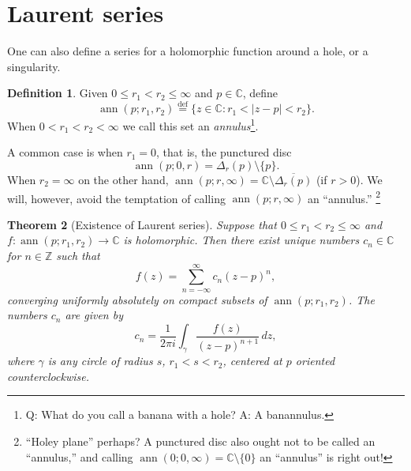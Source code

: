 \documentclass[12pt,openany]{book}
\newcommand{\ann}{\operatorname{ann}}
\newcommand{\sabs}[1]{\lvert {#1} \rvert}
\newcommand{\C}{{\mathbb{C}}}
\newcommand{\Z}{{\mathbb{Z}}}
\newcommand{\myindex}[1]{#1\index{#1}}
\newcommand{\myquote}[1]{``#1''}
\theoremstyle{plain}
\newtheorem{thm}{Theorem}[section]
\theoremstyle{remark}
\theoremstyle{definition}
\newtheorem{defn}[thm]{Definition}
\theoremstyle{exercise}
\theoremstyle{example}
\begin{document}

\section{Laurent series}

One can also define a series for a holomorphic function around a hole, or a singularity.

\begin{defn}
Given $0 \leq r_1 < r_2 \leq \infty$ and $p \in \C$, define
%
\begin{equation*}
\ann(p;r_1,r_2)
\overset{\text{def}}{=}
\{ z \in \C : r_1 < \sabs{z - p} < r_2 \} .
\end{equation*}
When $0 < r_1 < r_2 < \infty$ we call this set an
\emph{\myindex{annulus}}\footnote{%
Q\@: What do you call a banana with a hole?
A\@: A banannulus.}.
\end{defn}

A common case is when $r_1 = 0$, that is,
the punctured disc
\begin{equation*}
\ann(p;0,r) = \Delta_r(p) \setminus \{ p \} .
\end{equation*}
When $r_2 = \infty$ on the other hand,
$\ann(p;r,\infty) = \C \setminus \overline{\Delta_{r}(p)}$ (if $r > 0$).  We will,
however, avoid the temptation of calling $\ann(p;r,\infty)$ an \myquote{annulus.}%
\footnote{\myquote{Holey plane} perhaps?  A punctured disc also ought not to be
called an \myquote{annulus,} and calling $\ann(0;0,\infty) = \C \setminus
\{ 0 \}$ an \myquote{annulus} is right out!}

\begin{thm}[Existence of Laurent series]
%
%
\label{thm:laurent}%
Suppose that $0 \leq r_1 < r_2 \leq \infty$ and
$f \colon \ann(p;r_1,r_2) \to \C$ is holomorphic.
Then there exist unique numbers $c_n \in \C$ for $n \in \Z$ such that
%
\begin{equation*}
f(z) = \sum_{n=-\infty}^{\infty} c_n {(z-p)}^n ,
\end{equation*}
converging uniformly absolutely on compact subsets of
$\ann(p;r_1,r_2)$.  The numbers $c_n$ are given by
\begin{equation*}
c_n = 
\frac{1}{2\pi i}
\int_{\gamma}
\frac{f(z)}{{(z-p)}^{n+1}}
\,
dz  ,
\end{equation*}
where $\gamma$ is any circle of radius $s$, $r_1 < s < r_2$, centered at
$p$ oriented counterclockwise.
\end{thm}
\end{document}
